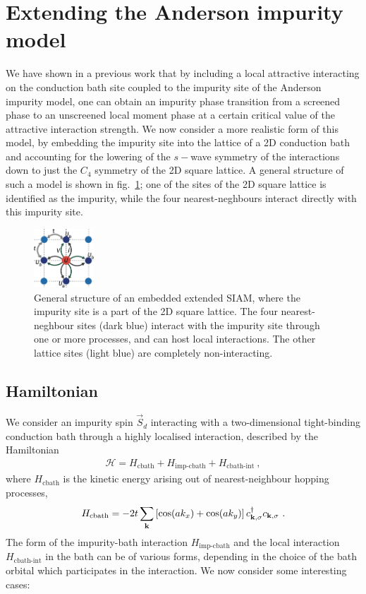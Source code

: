\documentclass[reprint,hidelinks]{revtex4-2}
\begin{document}
\section{Extending the Anderson impurity model}
We have shown in a previous work that by including a local attractive interacting on the conduction bath site coupled to the impurity site of the Anderson impurity model, one can obtain an impurity phase transition from a screened phase to an unscreened local moment phase at a certain critical value of the attractive interaction strength. We now consider a more realistic form of this model, by embedding the impurity site into the lattice of a 2D  conduction bath and accounting for the lowering of the \(s-\)wave symmetry of the interactions down to just the \(C_4\) symmetry of the 2D square lattice. A general structure of such a model is shown in fig.~\ref{embeddedEsiam}; one of the sites of the 2D square lattice is identified as the impurity, while the four nearest-neghbours interact directly with this impurity site. 
\begin{figure}[htpb]
	\centering
	\includegraphics[width=0.2\textwidth]{pWaveEsiam.pdf}
	\caption{General structure of an embedded extended SIAM, where the impurity site is a part of the 2D square lattice. The four nearest-neghbour sites (dark blue) interact with the impurity site through one or more processes, and can host local interactions. The other lattice sites (light blue) are completely non-interacting.}
	\label{embeddedEsiam}
\end{figure}
\subsection{Hamiltonian}
We consider an impurity spin \(\vec S_d\) interacting with a two-dimensional tight-binding conduction bath through a highly localised interaction, described by the Hamiltonian
\begin{equation}\begin{aligned}
	\mathcal{H} = H_\text{cbath} + H_\text{imp-cbath} + H_\text{cbath-int}~,
\end{aligned}\end{equation}
where \(H_\text{cbath}\) is the kinetic energy arising out of nearest-neighbour hopping processes,
\begin{equation}\begin{aligned}
	H_\text{cbath} = -2t\sum_{{\bf k}}\left[\cos(ak_x) + \cos(ak_y)\right] c^\dagger_{{\bf k},\sigma}c_{{\bf k},\sigma}~.
\end{aligned}\end{equation}
The form of the impurity-bath interaction \(H_\text{imp-cbath}\) and the local interaction \(H_\text{cbath-int}\) in the bath can be of various forms, depending in the choice of the bath orbital which participates in the interaction. We now consider some interesting cases:
\end{document}

